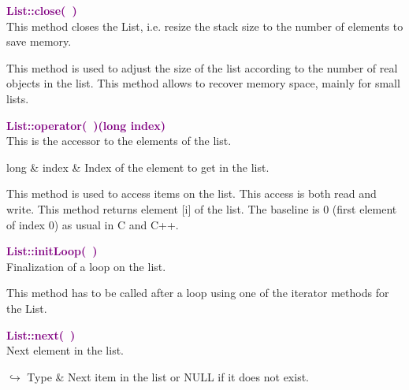 \textcolor{purple}{\textbf{List::close(~)}}\label{List::close()}\\
This method closes the List, i.e. resize the stack size to the number of elements to save memory.

This method is used to adjust the size of the list according to the number of real objects in the list.
This method allows to recover memory space, mainly for small lists.

\textcolor{purple}{\textbf{List::operator(~)(long index)}}\label{List::operator()(long index)}\\
This is the accessor to the elements of the list.

\begin{tcolorbox}[width=\textwidth,myArgs,tabularx={ll|R}]
long & index & Index of the element to get in the list.
\end{tcolorbox}

This method is used to access items on the list.
This access is both read and write.
This method returns element [i] of the list.
The baseline is 0 (first element of index 0) as usual in C and C++.

\textcolor{purple}{\textbf{List::initLoop(~)}}\label{List::initLoop()}\\
Finalization of a loop on the list.

This method has to be called after a loop using one of the iterator methods for the List.

\textcolor{purple}{\textbf{List::next(~)}}\label{List::next()}\\
Next element in the list.\vspace*{-0.5em}
\begin{tcolorbox}[grow to left by=-1cm, width=\textwidth-1cm,myArgs,tabularx={l|R}]
$\hookrightarrow$ Type & Next item in the list or NULL if it does not exist.
\end{tcolorbox}

